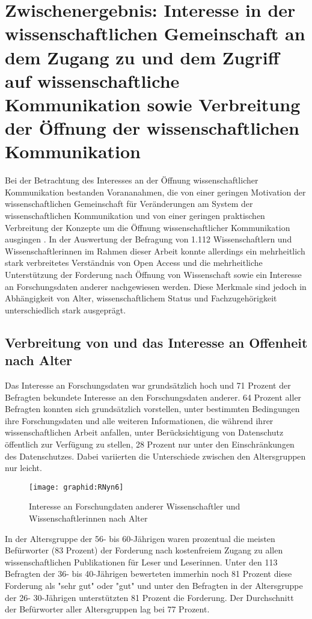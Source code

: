 \section{Zwischenergebnis: Interesse in der wissenschaftlichen Gemeinschaft an dem Zugang zu und dem Zugriff auf wissenschaftliche Kommunikation sowie Verbreitung der Öffnung der wissenschaftlichen Kommunikation}

Bei der Betrachtung des Interesses an der Öffnung wissenschaftlicher Kommunikation bestanden Vorananahmen, die von einer geringen Motivation der wissenschaftlichen Gemeinschaft für Veränderungen am System der wissenschaftlichen Kommunikation \cite{hagner_2015_sache_buches} und von einer geringen praktischen Verbreitung der Konzepte um die Öffnung wissenschaftlicher Kommunikation ausgingen \cite{Scheliga_2014}. In der Auswertung der Befragung von 1.112 Wissenschaftlern und Wissenschaftlerinnen im Rahmen dieser Arbeit konnte allerdings ein mehrheitlich stark verbreitetes Verständnis von Open Access und die mehrheitliche Unterstützung der Forderung nach Öffnung von Wissenschaft sowie ein Interesse an Forschungsdaten anderer nachgewiesen werden. Diese Merkmale sind jedoch in Abhängigkeit von Alter, wissenschaftlichem Status und Fachzugehörigkeit unterschiedlich stark ausgeprägt.

\subsection{Verbreitung von und das Interesse an Offenheit nach Alter}

Das Interesse an Forschungsdaten war grundsätzlich hoch und 71 Prozent der Befragten bekundete Interesse an den Forschungsdaten anderer. 64 Prozent aller Befragten konnten sich grundsätzlich vorstellen, unter bestimmten Bedingungen ihre Forschungsdaten und alle weiteren Informationen, die während ihrer wissenschaftlichen Arbeit anfallen, unter Berücksichtigung von Datenschutz öffentlich zur Verfügung zu stellen, 28 Prozent nur unter den Einschränkungen des Datenschutzes. Dabei variierten die Unterschiede zwischen den Altersgruppen nur leicht.

\begin{figure}[h!]
\texttt{[image: graphid:RNyn6]}
\caption{Interesse an Forschungdaten anderer Wissenschaftler und Wissenschaftlerinnen nach Alter}
\end{figure}

In der Altersgruppe der 56- bis 60-Jährigen waren prozentual die meisten Befürworter (83 Prozent) der Forderung nach kostenfreiem Zugang zu allen wissenschaftlichen Publikationen für Leser und Leserinnen. Unter den 113 Befragten der 36- bis 40-Jährigen bewerteten immerhin noch 81 Prozent diese Forderung als "sehr gut" oder "gut" und unter den Befragten in der Altersgruppe der 26- 30-Jährigen unterstützten 81 Prozent die Forderung. Der Durchschnitt der Befürworter aller Altersgruppen lag bei 77 Prozent.

